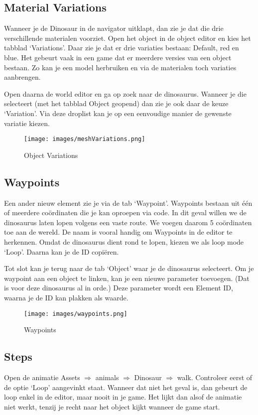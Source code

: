 \subsection{Material Variations}

Wanneer je de Dinosaur in de navigator uitklapt, dan zie je dat die drie verschillende materialen voorziet. Open het object in de object editor en kies het tabblad `Variations'. Daar zie je dat er drie variaties bestaan: Default, red en blue. Het gebeurt vaak in een game dat er meerdere versies van een object bestaan. Zo kan je een model herbruiken en via de materialen toch variaties aanbrengen. 

Open daarna de world editor en ga op zoek naar de dinosaurus. Wanneer je die selecteert (met het tabblad Object geopend) dan zie je ook daar de keuze `Variation'. Via deze droplist kan je op een eenvoudige manier de gewenste variatie kiezen.

\begin{figure}[h]
\centering
\texttt{[image: images/meshVariations.png]}
\caption[]{Object Variations}
\label{fig:objectVariations}
\end{figure}

\subsection{Waypoints}

Een ander nieuw element zie je via de tab `Waypoint'. Waypoints bestaan uit \'e\'en of meerdere co\"ordinaten die je kan oproepen via code. In dit geval willen we de dinosaurus laten lopen volgens een vaste route. We voegen daarom 5 co\"ordinaten toe aan de wereld. De naam is vooral handig om Waypoints in de editor te herkennen. Omdat de dinosaurus dient rond te lopen, kiezen we als loop mode `Loop'. Daarna kan je de ID copi\"eren. 

Tot slot kan je terug naar de tab `Object' waar je de dinosaurus selecteert. Om je waypoint aan een object te linken, kan je een nieuwe parameter toevoegen. (Dat is voor deze dinosaurus al in orde.) Deze parameter wordt een Element ID, waarna je de ID kan plakken als waarde.

\begin{figure}[h]
\centering
\texttt{[image: images/waypoints.png]}
\caption[]{Waypoints}
\label{fig:waypoints}
\end{figure}

\subsection{Steps}
Open de animatie Assets $\Rightarrow$ animals $\Rightarrow$ Dinosaur $\Rightarrow$ walk. Controleer eerst of de optie `Loop' aangevinkt staat. Wanneer dat niet het geval is, dan gebeurt de loop enkel in de editor, maar nooit in je game. Het lijkt dan alsof de animatie niet werkt, tenzij je recht naar het object kijkt wanneer de game start.

